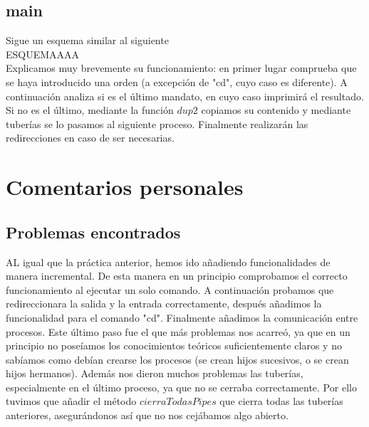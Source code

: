 \section{main}
Sigue un esquema similar al siguiente
\\
ESQUEMAAAA\\
Explicamos muy brevemente su funcionamiento: en primer lugar comprueba que se haya introducido una orden (a excepción de "cd", cuyo caso es diferente). A continuación analiza si es el último mandato, en cuyo caso imprimirá el resultado. Si no es el último, mediante la función $dup2$ copiamos su contenido y mediante tuberías se lo pasamos al siguiente proceso. Finalmente realizarán las redirecciones en caso de ser necesarias.\\


\chapter{Comentarios personales}
\section{Problemas encontrados}
AL igual que la práctica anterior, hemos ido añadiendo funcionalidades de manera incremental. De esta manera en un principio comprobamos el correcto funcionamiento al ejecutar un solo comando. A continuación probamos que redireccionara la salida y la entrada correctamente, después añadimos la funcionalidad para el comando "cd". Finalmente añadimos la comunicación entre procesos. Este último paso fue el que más problemas nos acarreó, ya que en un principio no poseíamos los conocimientos teóricos suficientemente claros y no sabíamos como debían crearse los procesos (se crean hijos sucesivos, o se crean hijos hermanos). Además nos dieron muchos problemas las tuberías, especialmente en el último proceso, ya que no se cerraba correctamente. Por ello tuvimos que añadir el método $cierraTodasPipes$ que cierra todas las tuberías anteriores, asegurándonos así que no nos cejábamos algo abierto.
